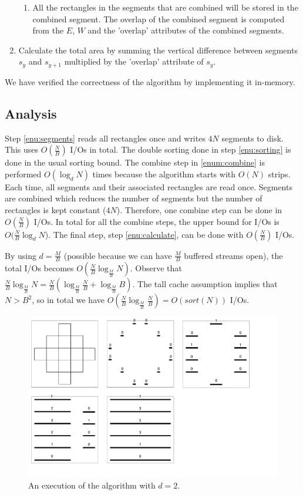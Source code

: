 \begin{enumerate}
\begin{enumerate}
        \item All the rectangles in the segments that are combined will be stored in the combined segment. The overlap of the combined segment is computed from the $E$, $W$ and the 'overlap' attributes of the combined segments.
    \end{enumerate}
\item \label{enu:calculate} Calculate the total area by summing the vertical difference between segments $s_{y}$ and $s_{y+1}$ multiplied by the 'overlap' attribute of $s_{y}$.
\end{enumerate}

We have verified the correctness of the algorithm by implementing it in-memory.

\subsection{Analysis}

Step \ref{enu:segments} reads all rectangles once and writes $4N$ segments to disk. This uses $O(\frac{N}{B})$ I/Os in total. The double sorting done in step \ref{enu:sorting} is done in the usual sorting bound. The combine step in \ref{enum:combine} is performed $O(\log_{d}{N})$ times because the algorithm starts with $O(N)$ strips. Each time, all segments and their associated rectangles are read once. Segments are combined which reduces the number of segments but the number of rectangles is kept constant ($4N$). Therefore, one combine step can be done in $O(\frac{N}{B})$ I/Os. In total for all the combine steps, the upper bound for I/Os is $O(\frac{N}{B}\log_{d}{N}$). The final step, step \ref{enu:calculate}, can be done with $O(\frac{N}{B})$ I/Os.

By using $d = \frac{M}{B}$ (possible because we can have $\frac{M}{B}$ buffered streams open), the total I/Os becomes $O(\frac{N}{B}\log_{\frac{M}{B}}{N})$. Observe that $\frac{N}{B}\log_{\frac{M}{B}}{N}=\frac{N}{B}(\log_{\frac{M}{B}}{\frac{N}{B}}+\log_{\frac{M}{B}}{B})$. The tall cache assumption implies that $N>B^2$, so in total we have $O(\frac{N}{B}\log_{\frac{M}{B}}{\frac{N}{B}})=O(sort(N))$ I/Os.

\begin{figure}[h!]
  \centering
  \includegraphics[width=1.12\textwidth]{images/Segments}
  \caption{An execution of the algorithm with $d = 2$.}
  \label{fig:segments}
\end{figure}